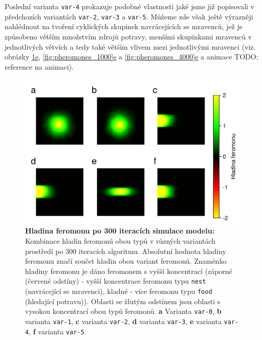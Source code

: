 \documentclass[10pt,a4paper,twocolumn]{article}
\begin{document}
Poslední varianta \texttt{var-4} prokazuje podobné vlastnosti 
jaké jsme již popisovali v předchozích variantách 
\texttt{var-2}, \texttt{var-3} a \texttt{var-5}. Můžeme zde však ještě 
výrazněji nahlédnout na tvoření cyklických skupinek navrácejících
se mravenců, jež je způsobeno větším množstvím zdrojů potravy, menšími skupinkami
mravenců v jednotlivých větvích a tedy také větším vlivem mezi 
jednotlivými mravenci (viz. obrázky 
\hyperref[fig:pheromones_300]{\ref*{fig:pheromones_300}e}, 
\hyperref[fig:pheromones_1000]{\ref*{fig:pheromones_1000}e} a 
\hyperref[fig:pheromones_4000]{\ref*{fig:pheromones_4000}e}
a animace TODO: reference na animaci).


\begin{figure}[tb]
  \centering
  \includegraphics[width=0.98\linewidth]{images/pheromone_levels_300.pdf}
  \caption{\textbf{Hladina feromonu po 300 iteracích simulace modelu:} 
  Kombinace hladin feromonů obou typů v různých variantách prostředí 
  po 300 iteracích algoritmu. 
  Absolutní hodnota hladiny feromonu značí součet hladin obou variant
  feromonů. Znaménko hladiny feromonu je dáno
  feromonem s vyšší koncentrací (záporné (červené odstíny) - vyšší 
  koncentrace feromonu typu \texttt{nest} (navrácející se mravenci), 
  kladné - více feromonu typu \texttt{food} (hledající potravu)). 
  Oblasti se žlutým odstínem jsou oblasti s vysokou 
  koncentrací obou typů feromonů.
  \textbf{a} Varianta \texttt{var-0}, 
  \textbf{b} varianta \texttt{var-1},
  \textbf{c} varianta \texttt{var-2},
  \textbf{d} varianta \texttt{var-3},
  \textbf{e} varianta \texttt{var-4},
  \textbf{f} varianta \texttt{var-5}.}
  \label{fig:pheromones_300}
\end{figure}
\end{document}
